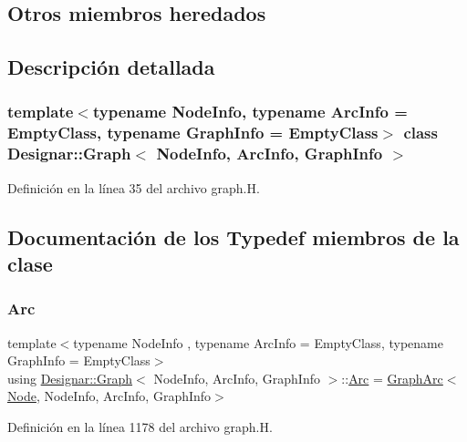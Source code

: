 \subsection*{Otros miembros heredados}


\subsection{Descripción detallada}
\subsubsection*{template$<$typename Node\+Info, typename Arc\+Info = Empty\+Class, typename Graph\+Info = Empty\+Class$>$\newline
class Designar\+::\+Graph$<$ Node\+Info, Arc\+Info, Graph\+Info $>$}



Definición en la línea 35 del archivo graph.\+H.



\subsection{Documentación de los \textquotesingle{}Typedef\textquotesingle{} miembros de la clase}
\mbox{\label{class_designar_1_1_graph_a74c730ef4ce2d20f998d72bd25c2b5bf}} 
\subsubsection{\texorpdfstring{Arc}{Arc}}
{\footnotesize\ttfamily template$<$typename Node\+Info , typename Arc\+Info  = Empty\+Class, typename Graph\+Info  = Empty\+Class$>$ \\
using \hyperlink{class_designar_1_1_graph}{Designar\+::\+Graph}$<$ Node\+Info, Arc\+Info, Graph\+Info $>$\+::\hyperlink{class_designar_1_1_graph_a74c730ef4ce2d20f998d72bd25c2b5bf}{Arc} =  \hyperlink{class_designar_1_1_graph_arc}{Graph\+Arc}$<$\hyperlink{class_designar_1_1_graph_a5dfc7dba9d092ac489c72e40390c37d0}{Node}, Node\+Info, Arc\+Info, Graph\+Info$>$}



Definición en la línea 1178 del archivo graph.\+H.

\mbox{\label{class_designar_1_1_graph_abc2adb4841a6d092d5093f9e60f2c8be}} 
